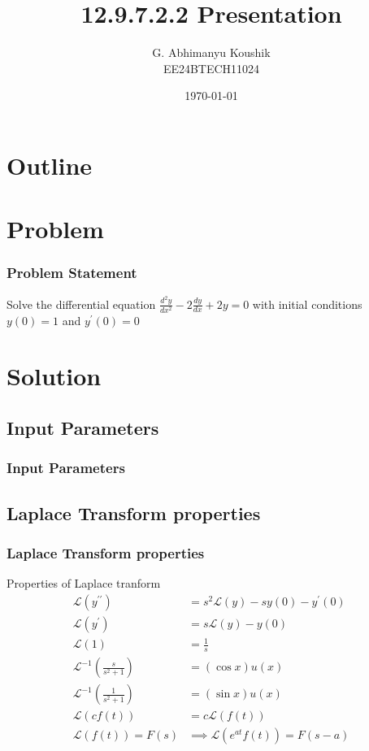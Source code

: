 \documentclass{beamer}
\title{12.9.7.2.2 Presentation}
\author{G. Abhimanyu Koushik \\ EE24BTECH11024}
\date{\today}
\providecommand{\brak}[1]{\ensuremath{\left(#1\right)}}
\theoremstyle{remark}
\numberwithin{equation}{section}
\begin{document}
\begin{frame}
\titlepage
\end{frame}

\section*{Outline}
\begin{frame}
\tableofcontents
\end{frame}
\section{Problem}
\begin{frame}
\frametitle{Problem Statement}
%

Solve the differential equation $\frac{d^2y}{dx^2} -2\frac{dy}{dx} + 2y = 0$ with initial conditions $y\brak{0} = 1$ and $y^{\prime}\brak{0} = 0$
%
\end{frame}

\section{Solution}
\subsection{Input Parameters}
\begin{frame}
\frametitle{Input Parameters}
\begin{table}[H]    
  \centering
  
\end{table}
\end{frame}
\subsection{Laplace Transform properties}
\begin{frame}
\frametitle{Laplace Transform properties}
Properties of Laplace tranform
\begin{align}
	\mathcal{L}\brak{y^{\prime\prime}} &= s^2\mathcal{L}\brak{y} -sy\brak{0}-y^\prime\brak{0}\\
	\mathcal{L}\brak{y^{\prime}} &= s\mathcal{L}\brak{y} -y\brak{0}\\
	\mathcal{L}\brak{1} &= \frac{1}{s}\\
	\mathcal{L}^{-1}\brak{\frac{s}{s^2+1}} &= \brak{\cos{x}}u\brak{x}\\
	\mathcal{L}^{-1}\brak{\frac{1}{s^2+1}} &= \brak{\sin{x}}u\brak{x}\\
	\mathcal{L}\brak{cf\brak{t}} &= c\mathcal{L}\brak{f\brak{t}}\\
	\mathcal{L}\brak{f\brak{t}} = F\brak{s} &\implies \mathcal{L}\brak{e^{at}f\brak{t}} = F\brak{s-a}	
\end{align}
\end{frame}
\end{document}
